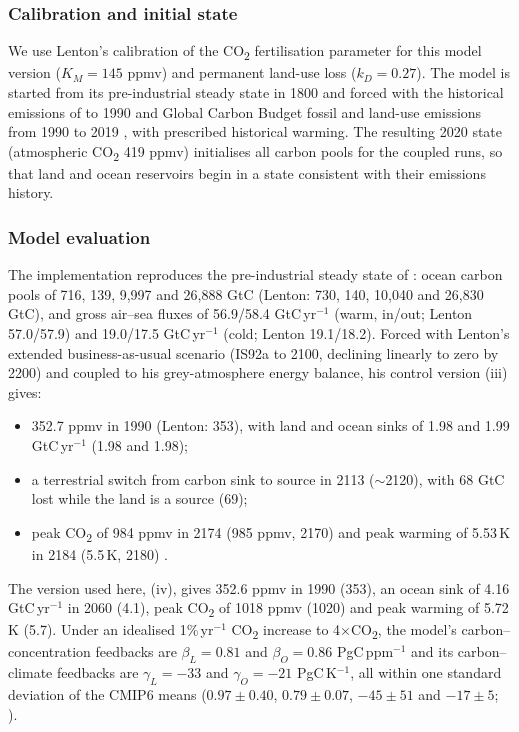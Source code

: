 \subsubsection{Calibration and initial state}
We use Lenton's calibration of the CO\textsubscript{2} fertilisation parameter for this model version ($K_M = 145$ ppmv) and permanent land-use loss ($k_D = 0.27$). The model is started from its pre-industrial steady state in 1800 and forced with the historical emissions of \citet[Table~3]{lentonLandOceanCarbon2000} to 1990 and Global Carbon Budget fossil and land-use emissions from 1990 to 2019 \citep{friedlingsteinGlobalCarbonBudget2025}, with prescribed historical warming. The resulting 2020 state (atmospheric CO\textsubscript{2} 419 ppmv) initialises all carbon pools for the coupled runs, so that land and ocean reservoirs begin in a state consistent with their emissions history.

\subsubsection{Model evaluation}
The implementation reproduces the pre-industrial steady state of \citet[Fig.~1]{lentonLandOceanCarbon2000}: ocean carbon pools of 716, 139, 9{,}997 and 26{,}888 GtC (Lenton: 730, 140, 10{,}040 and 26{,}830 GtC), and gross air--sea fluxes of 56.9/58.4 GtC\,yr$^{-1}$ (warm, in/out; Lenton 57.0/57.9) and 19.0/17.5 GtC\,yr$^{-1}$ (cold; Lenton 19.1/18.2). Forced with Lenton's extended business-as-usual scenario (IS92a to 2100, declining linearly to zero by 2200) and coupled to his grey-atmosphere energy balance, his control version (iii) gives:
\begin{itemize}
\item 352.7 ppmv in 1990 (Lenton: 353), with land and ocean sinks of 1.98 and 1.99 GtC\,yr$^{-1}$ (1.98 and 1.98);
\item a terrestrial switch from carbon sink to source in 2113 (${\sim}$2120), with 68 GtC lost while the land is a source (69);
\item peak CO\textsubscript{2} of 984 ppmv in 2174 (985 ppmv, 2170) and peak warming of 5.53\,K in 2184 (5.5\,K, 2180) \citep[Sect.~5.1]{lentonLandOceanCarbon2000}.
\end{itemize}
The version used here, (iv), gives 352.6 ppmv in 1990 (353), an ocean sink of 4.16 GtC\,yr$^{-1}$ in 2060 (4.1), peak CO\textsubscript{2} of 1018 ppmv (1020) and peak warming of 5.72\,K (5.7).
Under an idealised 1\%\,yr$^{-1}$ CO\textsubscript{2} increase to 4$\times$CO\textsubscript{2}, the model's carbon--concentration feedbacks are $\beta_L = 0.81$ and $\beta_O = 0.86$ PgC\,ppm$^{-1}$ and its carbon--climate feedbacks are $\gamma_L = -33$ and $\gamma_O = -21$ PgC\,K$^{-1}$, all within one standard deviation of the CMIP6 means ($0.97 \pm 0.40$, $0.79 \pm 0.07$, $-45 \pm 51$ and $-17 \pm 5$; \citealp[Table~A1]{aroraCarbonConcentrationCarbon2020}).

